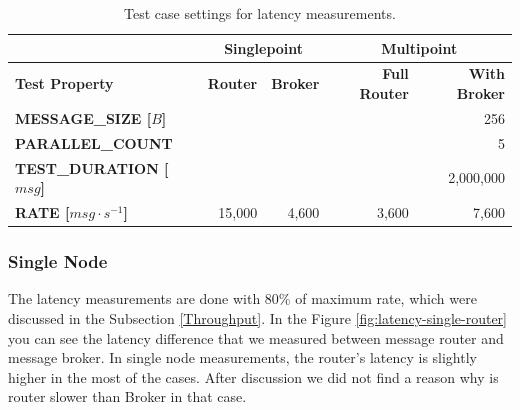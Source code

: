 \begingroup
\setlength{\tabcolsep}{10pt} %
\renewcommand{\arraystretch}{1.35} %
	\begin{table}[H]
	\centering
	\begin{tabular}{|l|r|r|r|r|}
	\hline
	\rowcolor[HTML]{C5E3DF}
	 & \multicolumn{2}{c|}{\textbf{Singlepoint}} & \multicolumn{2}{c|}{\textbf{Multipoint}} \\ \hline
	\rowcolor[HTML]{C5E3DF}
	\textbf{Test Property} & \textbf{Router} & \textbf{Broker} & \textbf{Full Router} & \textbf{With Broker} \\ \hline
	\textbf{MESSAGE\_SIZE [$B$]} & \multicolumn{4}{r|}{256} \\ \hline
	\textbf{PARALLEL\_COUNT} & \multicolumn{4}{r|}{5} \\ \hline
	\textbf{TEST\_DURATION [$msg$]} & \multicolumn{4}{r|}{2,000,000} \\ \hline
	\textbf{RATE [$msg \cdot s^{-1}$]} & 15,000 & 4,600 & 3,600 & 7,600 \\ \hline
	\end{tabular}
	\caption{Test case settings for latency measurements.}
	\label{tab:test_case_latency}
	\end{table}
\endgroup

\subsubsection*{Single Node}
The latency measurements are done with 80\% of maximum rate, which were discussed in the Subsection \ref{Throughput}. In the Figure \ref{fig:latency-single-router} you can see the latency difference that we measured between message router and message broker. In single node measurements, the router's latency is slightly higher in the most of the cases. After discussion we did not find a reason why is router slower than Broker in that case.


